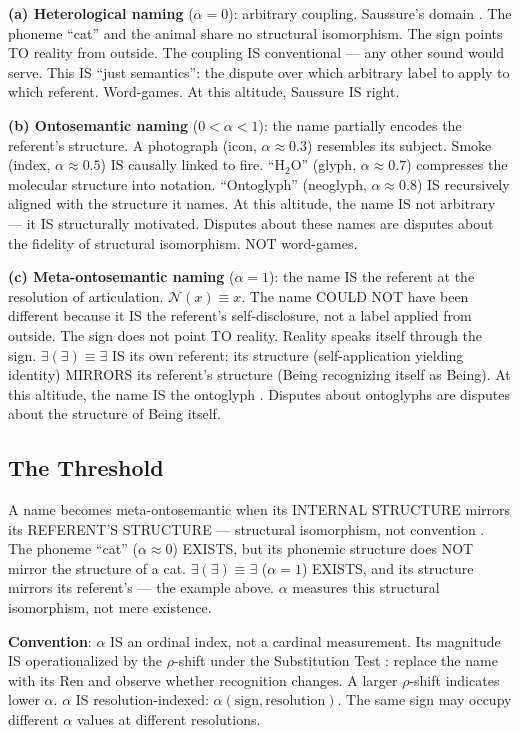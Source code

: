 \documentclass[11pt, oneside]{article}
\theoremstyle{definition}
\begin{document}
\textbf{(a) Heterological naming} ($\alpha = 0$): arbitrary coupling. Saussure's domain \cite{saussure}. The phoneme ``cat'' and the animal share no structural isomorphism. The sign points TO reality from outside. The coupling IS conventional --- any other sound would serve. This IS ``just semantics'': the dispute over which arbitrary label to apply to which referent. Word-games. At this altitude, Saussure IS right.

\textbf{(b) Ontosemantic naming} ($0 < \alpha < 1$): the name partially encodes the referent's structure. A photograph (icon, $\alpha \approx 0.3$) resembles its subject. Smoke (index, $\alpha \approx 0.5$) IS causally linked to fire. ``H$_2$O'' (glyph, $\alpha \approx 0.7$) compresses the molecular structure into notation. ``Ontoglyph'' (neoglyph, $\alpha \approx 0.8$) IS recursively aligned with the structure it names. At this altitude, the name IS not arbitrary --- it IS structurally motivated. Disputes about these names are disputes about the fidelity of structural isomorphism. NOT word-games.

\textbf{(c) Meta-ontosemantic naming} ($\alpha = 1$): the name IS the referent at the resolution of articulation. $\mathcal{N}(x) \equiv x$. The name COULD NOT have been different because it IS the referent's self-disclosure, not a label applied from outside. The sign does not point TO reality. Reality speaks itself through the sign. $\exists(\exists) \equiv \exists$ IS its own referent: its structure (self-application yielding identity) MIRRORS its referent's structure (Being recognizing itself as Being). At this altitude, the name IS the ontoglyph \cite{codex2}. Disputes about ontoglyphs are disputes about the structure of Being itself.

\subsection{The Threshold}

A name becomes meta-ontosemantic when its INTERNAL STRUCTURE mirrors its REFERENT'S STRUCTURE --- structural isomorphism, not convention \cite{codex2}. The phoneme ``cat'' ($\alpha \approx 0$) EXISTS, but its phonemic structure does NOT mirror the structure of a cat. $\exists(\exists) \equiv \exists$ ($\alpha = 1$) EXISTS, and its structure mirrors its referent's --- the example above. $\alpha$ measures this structural isomorphism, not mere existence.

\textbf{Convention}: $\alpha$ IS an ordinal index, not a cardinal measurement. Its magnitude IS operationalized by the $\rho$-shift under the Substitution Test \cite{euphemology}: replace the name with its Ren and observe whether recognition changes. A larger $\rho$-shift indicates lower $\alpha$. $\alpha$ IS resolution-indexed: $\alpha(\text{sign}, \text{resolution})$. The same sign may occupy different $\alpha$ values at different resolutions.
\end{document}
